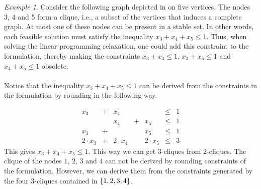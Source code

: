 \documentclass[titlepage]{book}
\theoremstyle{plain}
\theoremstyle{definition}
\theoremstyle{remark}
\newtheorem{example}{Example}
\begin{document}
\begin{example}
Consider the following graph depicted in  on five vertices. The nodes 3, 4 and 5 form a clique, i.e., a subset of the vertices that induces a complete graph. At most one of these nodes can be present in a stable set. In other words, each feasible solution must satisfy the inequality $x_3+x_4+x_5\leq 1$. Thus, when solving the linear programming relaxation, one could add this constraint to the formulation, thereby making the constraints $x_3+x_4\leq 1$, $x_3+x_5\leq 1$ and $x_4+x_5\leq 1$ obsolete.


\paragraph{}
Notice that the inequality $x_3+x_4+x_5\leq 1$ can be derived from the constraints in the formulation by rounding in the following way.

\begin{equation}
\begin{array}{rcrcrcc}
x_3&+&x_4&&&\leq&1\\
&&x_4&+&x_5&\leq&1\\
x_3&+&&&x_5&\leq&1\\\hline
2\cdot x_3&+&2\cdot x_4&&2\cdot x_5&\leq&3
\end{array}
\end{equation}
This gives $x_3+x_4+x_5\leq 1$. This way we can get $3$-cliques from $2$-cliques. The clique of the nodes $1$, $2$, $3$ and $4$ can not be derived by rounding constraints of the formulation. However, we can derive them from the constraints generated by the four $3$-cliques contained in $\left\{ 1,2,3,4 \right\}$.
\end{example}
\end{document}
